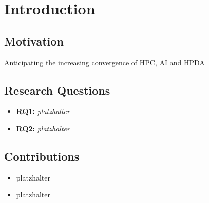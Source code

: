 \chapter{Introduction}
\label{Introduction}

\section{Motivation}

Anticipating the increasing convergence of \ac{HPC}, \ac*{AI} and \ac*{HPDA}


\section{Research Questions}

\begin{itemize}
    \item \textbf{RQ1:} \textit{ platzhalter}
    \item \textbf{RQ2:} \textit{platzhalter}
\end{itemize}

\section{Contributions}

\begin{itemize}
    \item platzhalter   
    \item platzhalter   
\end{itemize}